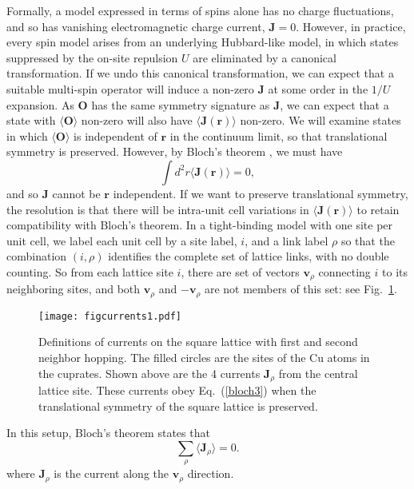\documentclass[aps,prb,preprint,onecolumn,citeautoscript,superscriptaddress,footinbib,
eqsecnum]{revtex4-1}
\newcommand{\beq}{\begin{equation}}
\newcommand{\eeq}{\end{equation}}
\begin{document}
Formally, a model expressed in terms of spins alone has no charge fluctuations, and so has vanishing
electromagnetic charge current, ${\bm J}=0$. 
However, in practice, every spin model arises from an underlying Hubbard-like model, in which
states suppressed by the on-site repulsion $U$ are eliminated by a canonical transformation. If we undo this canonical transformation, we can
expect that a suitable multi-spin operator will induce a non-zero ${\bm J}$ at some order in the $1/U$ expansion.
As ${\bm O}$ has the same symmetry signature as ${\bm J}$, we can expect that 
a state with $\langle {\bm O} \rangle$ non-zero will also have $\langle {\bm J} ({\bm r}) \rangle$ non-zero.
We will examine states in which $\langle {\bm O} \rangle$ is independent of ${\bm r}$ in the continuum limit, 
so that translational symmetry is preserved. However, by Bloch's
theorem \cite{Bohm49,1996JPSJ...65.3254O}, we must have
\beq
\int d^2 r \langle {\bm J} ({\bm r}) \rangle = 0, \label{bloch}
\eeq
and so ${\bm J}$ cannot be ${\bm r}$
independent. If we want to preserve translational symmetry, the resolution is that there
will be intra-unit cell variations in $\langle {\bm J} ({\bm r}) \rangle$ to retain compatibility with Bloch's theorem. In a tight-binding model with one site per unit cell, we 
label each unit cell by a site label, $i$, and a link label $\rho$ so that the combination
$(i, \rho)$ identifies the complete set of lattice links, with no double counting. So from each lattice site $i$, there
are set of vectors ${\bm v}_\rho$ connecting $i$ to its neighboring sites, and both ${\bm v}_\rho$ and
$-{\bm v}_\rho$ are not members of this set: see Fig.~\ref{fig:currents1}.
\begin{figure}
\begin{center}
\texttt{[image: figcurrents1.pdf]}
\end{center}
\caption{Definitions of currents on the square lattice with first and second neighbor
hopping. The filled circles are the sites of the Cu atoms in the cuprates. 
Shown above are the 4 currents
${\bm J}_\rho$ from the central lattice site. These currents obey Eq.~(\ref{bloch3}) when the translational
symmetry of the square lattice is preserved.}
\label{fig:currents1}
\end{figure}
In this setup, Bloch's theorem states that
\begin{equation}
\sum_{\rho} \langle {\bm J}_\rho \rangle  = 0. \label{bloch3}
\end{equation}
where ${\bm J}_\rho$ is the current along the ${\bm v}_\rho$ direction. 
\end{document}
